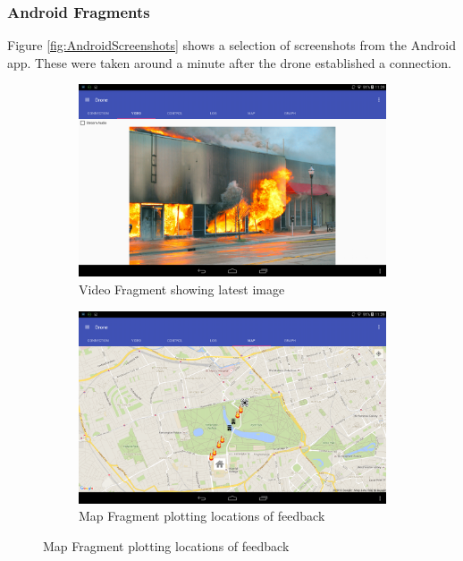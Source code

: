 \documentclass{article}
\begin{document}
\subsubsection{Android Fragments}
Figure \ref{fig:AndroidScreenshots} shows a selection of screenshots from the Android app. These were taken around a minute after the drone established a connection.
\begin{landscape}
\begin{figure}[h]
\caption{Screenshots of the Android App\label{fig:AndroidScreenshots}}
\centering
\begin{subfigure}[b]{.45\linewidth}
\includegraphics[width=\linewidth]{VideoFragment}
\caption{Video Fragment showing latest image}
\end{subfigure}
\begin{subfigure}[b]{.45\linewidth}
\includegraphics[width=\linewidth]{MapFragment}
\caption{Map Fragment plotting locations of feedback}
\end{subfigure}


\end{figure}
\end{landscape}
\end{document}
